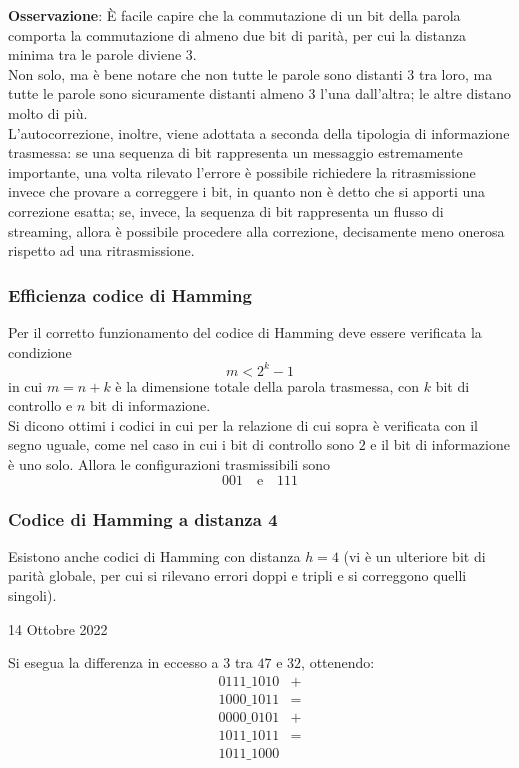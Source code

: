 \documentclass[a4paper]{extarticle}
\begin{document}
\vspace{1em}
\noindent
\textbf{Osservazione}: È facile capire che la commutazione di un bit della parola comporta la commutazione di almeno due bit di parità, per cui la distanza minima tra le parole diviene $3$.\\
Non solo, ma è bene notare che non tutte le parole sono distanti $3$ tra loro, ma tutte le parole sono sicuramente distanti almeno $3$ l'una dall'altra; le altre distano molto di più.\\
L'autocorrezione, inoltre, viene adottata a seconda della tipologia di informazione trasmessa: se una sequenza di bit rappresenta un messaggio estremamente importante, una volta rilevato l'errore è possibile richiedere la ritrasmissione invece che provare a correggere i bit, in quanto non è detto che si apporti una correzione esatta; se, invece, la sequenza di bit rappresenta un flusso di streaming, allora è possibile procedere alla correzione, decisamente meno onerosa rispetto ad una ritrasmissione.

\vspace{1em}
\subsubsection{Efficienza codice di Hamming}
Per il corretto funzionamento del codice di Hamming deve essere verificata la condizione
\[m < 2^k-1\]
in cui $m=n+k$ è la dimensione totale della parola trasmessa, con $k$ bit di controllo e $n$ bit di informazione.\\
Si dicono ottimi i codici in cui per la relazione di cui sopra è verificata con il segno uguale, come nel caso in cui i bit di controllo sono $2$ e il bit di informazione è uno solo. Allora le configurazioni trasmissibili sono
\[\boxed{0}\boxed{0}1 \hspace{1em} \text{e} \hspace{1em} \boxed{1}\boxed{1}1\]

\vspace{1em}
\subsubsection{Codice di Hamming a distanza 4}
Esistono anche codici di Hamming con distanza $h=4$ (vi è un ulteriore bit di parità globale, per cui si rilevano errori doppi e tripli e si correggono quelli singoli).

\newpage
\begin{center}
    14 Ottobre 2022
\end{center}
Si esegua la differenza in eccesso a $3$ tra $47$ e $32$, ottenendo:
\begin{align*}
    0111\_1010 & +\\
    1000\_1011 & =\\
    0000\_0101 & +\\
    1011\_1011 & =\\
    1011\_1000
\end{align*}
\end{document}
